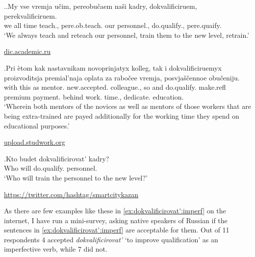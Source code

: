 \ex.\label{ex:dokvalificirovat':imperf}\ag.\label{ex:dokvalificirovat':ongoing}My vse vremja u\v{c}im, pereobu\v{c}aem na\v{s}i kadry, dokvalificiruem, perekvalificiruem.\\
we all time teach., pere.ob.teach. our personnel., do.qualify., pere.quaify.\\
\vspace{0.5em}
`We always teach and reteach our personnel, train them to the new level, retrain.' 
\begin{flushright}
\vspace{-0.5em}
\url{dic.academic.ru}
\end{flushright}
\bg.\label{ex:dokvalificirovat':part}Pri \`{e}tom kak nastavnikam novoprinjatyx kolleg, tak i dokvalificiruemyx proizvoditsja premial'naja oplata za rabo\v{c}ee vremja, posvja\v{s}\v{c}ennoe obu\v{c}eniju.\\
with this as mentor. new.accepted. colleague., so and do.qualify. make.refl premium payment. behind work. time., dedicate. education.\\
\vspace{0.5em}
`Wherein both mentors of the novices as well as mentors of those workers that are being extra-trained are payed additionally for the working time they spend on educational purposes.'
\begin{flushright}
\vspace{-0.5em}
\url{upload.studwork.org}
\end{flushright}
\bg.\label{ex:dokvalificirovat':future}Kto budet dokvalificirovat' kadry?\\
Who will do.qualify. personnel.\\
\vspace{0.5em}
`Who will train the personnel to the new level?'
\begin{flushright}
\vspace{-0.5em}
\url{https://twitter.com/hashtag/smartcitykazan}
\end{flushright}

As there are few examples like these in \ref{ex:dokvalificirovat':imperf} on the internet, I have run a mini-survey, asking native speakers of Russian if the sentences in \ref{ex:dokvalificirovat':imperf} are acceptable for them. Out of 11 respondents 4 accepted \textit{dokvalificirovat'} `to improve qualification' as an imperfective verb, while 7 did not.

